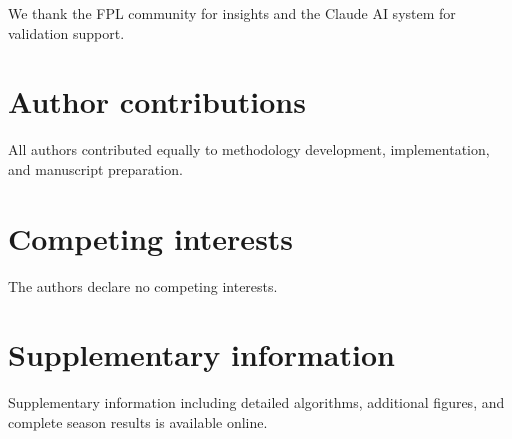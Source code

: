 \documentclass[10pt,a4paper]{article}
\begin{document}
We thank the FPL community for insights and the Claude AI system for validation support.

\section*{Author contributions}

All authors contributed equally to methodology development, implementation, and manuscript preparation.

\section*{Competing interests}

The authors declare no competing interests.

\section*{Supplementary information}

Supplementary information including detailed algorithms, additional figures, and complete season results is available online.
\end{document}
